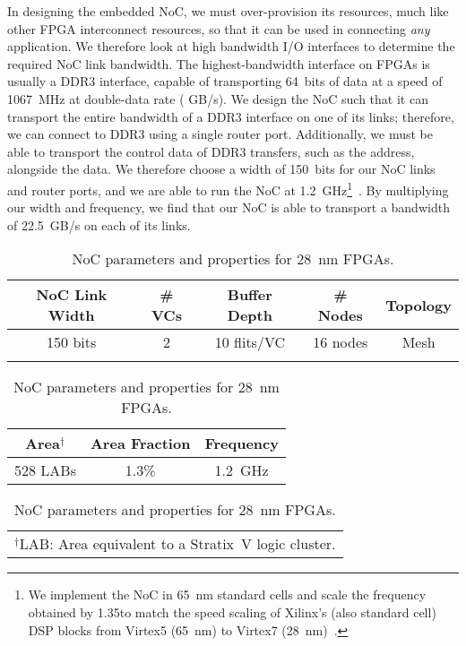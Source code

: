 In designing the embedded NoC, we must over-provision its resources, much like other FPGA interconnect resources, so that it can be used in connecting \textit{any} application.
We therefore look at high bandwidth I/O interfaces to determine the required NoC link bandwidth.
The highest-bandwidth interface on FPGAs is usually a DDR3 interface, capable of transporting 64~bits of data at a speed of 1067~MHz at double-data rate ( GB/s).
We design the NoC such that it can transport the entire bandwidth of a DDR3 interface on one of its links; therefore, we can connect to DDR3 using a single router port.
Additionally, we must be able to transport the control data of DDR3 transfers, such as the address, alongside the data.
We therefore choose a width of 150~bits for our NoC links and router ports, and we are able to run the NoC at 1.2~GHz\footnote{We implement the NoC in 65~nm standard cells and scale the frequency obtained by 1.35\xx to match the speed scaling of Xilinx's (also standard cell) DSP blocks from Virtex5 (65~nm) to Virtex7 (28~nm)~\cite{xilinx_datasheets}.}~\cite{noc_designer}.
By multiplying our width and frequency, we find that our NoC is able to transport a bandwidth of 22.5~GB/s on each of its links.

%
%
\begin{table}[!t]
\centering
\begin{small}
\setlength{\tabcolsep}{3.5pt}
    \caption{NoC parameters and properties for 28~nm FPGAs.}
    \label{noc_params}
    \begin{tabular}{ccccc}
    \toprule
    NoC Link Width & \# VCs & Buffer Depth & \# Nodes & Topology\\
    \midrule
	150 bits &       2       &	 10 flits/VC     &      16 nodes & Mesh \\
    \bottomrule
	\\
    \end{tabular}
\setlength{\tabcolsep}{6pt}
    \begin{tabular}{ccc}
    \toprule
    Area$^\dagger$  & Area Fraction & Frequency   \\
    \midrule
	       528 LABs          &      1.3\%       &	 1.2~GHz    \\
    \bottomrule
    \end{tabular}
    \begin{tabular}{ccc}
	\multicolumn{3}{l}{$^\dagger$LAB: Area equivalent to a Stratix~V logic cluster.}\\
    \end{tabular}
\end{small}
\end{table}
%
%

